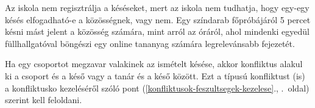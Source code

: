 Az iskola nem regisztrálja a késéseket, mert az iskola nem tudhatja,
hogy egy-egy késés elfogadható-e a közösségnek, vagy nem. Egy színdarab
főpróbájáról 5 percet késni mást jelent a közösség számára, mint arról
az óráról, ahol mindenki egyedül füllhallgatóval böngészi egy online
tananyag számára legrelevánsabb fejezetét.

Ha egy csoportot megzavar valakinek az ismételt késése, akkor
konfliktus alakul ki a csoport és a késő vagy a tanár és a késő
között. Ezt a típusú konfliktust (is) a konfliktusko kezeléséről szóló
pont
(\ref{konfliktusok-feszultsegek-kezelese}., .~oldal)
szerint kell feloldani.
